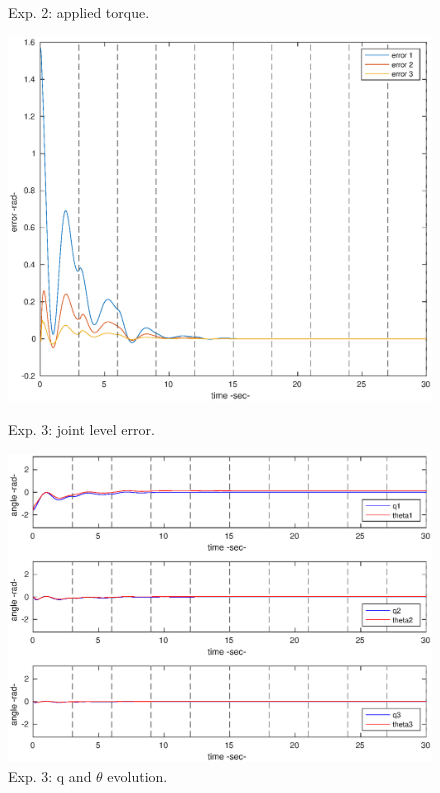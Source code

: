 \begin{center}
\begin{figure}[h!]
\begin{minipage}[h!]{0.45\linewidth}
\caption{\label{2_1ceff}
Exp. 2: applied torque.}
\end{minipage}
\hspace{0.5cm}
\begin{minipage}[h!]{0.45\linewidth}
\includegraphics[scale=0.35]{figures/2_2_error.eps}
\caption{\label{2_2err}
Exp. 3: joint level error.}
\includegraphics[scale=0.35]{figures/2_2_qtheta.eps}
\caption{\label{2_2qt}
Exp. 3: q and \(\theta\) evolution.}

\end{minipage}
\end{figure}
\end{center}
